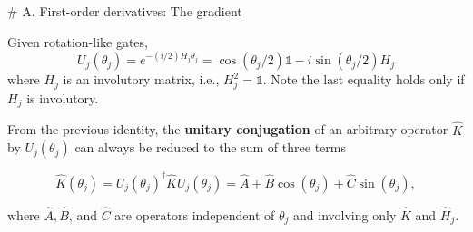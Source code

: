 # A. First-order derivatives: The gradient

Given rotation-like gates,
\begin{equation}
    U_j(\theta_j) = e^{-(i / 2) H_j \theta_j} = \cos \left(\theta_j / 2\right) \mathbb{1} - i \sin \left(\theta_j / 2\right) H_j
\end{equation}
where $H_j$ is an involutory matrix, i.e., $H_j^2 = \mathbb{1}$. Note the last equality holds only if $H_j$ is involutory.

From the previous identity, the \textbf{unitary conjugation} of an arbitrary operator $\hat{K}$ by $U_j\left(\theta_j\right)$ can always be reduced to the sum of three terms

\begin{equation}
    \hat{K}\left(\theta_j\right)=U_j\left(\theta_j\right)^{\dagger} \hat{K} U_j\left(\theta_j\right)=\hat{A}+\hat{B} \cos \left(\theta_j\right)+\hat{C} \sin \left(\theta_j\right),
\end{equation}

where $\hat{A}, \hat{B}$, and $\hat{C}$ are operators independent of $\theta_j$ and involving only $\hat{K}$ and $\hat{H}_j$.

